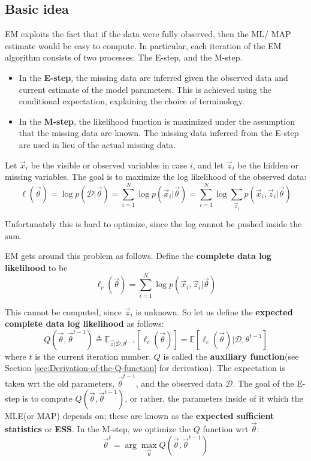 \subsection{Basic idea}
EM exploits the fact that if the data were fully observed, then the ML/ MAP estimate would be easy to compute. In particular, each iteration of the EM algorithm consists of two processes: The E-step, and the M-step. 
\begin{itemize}
\item{In the \textbf{E-step}, the missing data are inferred given the observed data and current estimate of the model parameters. This is achieved using the conditional expectation, explaining the choice of terminology.}
\item{In the \textbf{M-step}, the likelihood function is maximized under the assumption that the missing data are known. The missing data inferred from the E-step are used in lieu of the actual missing data.}
\end{itemize}

Let $\vec{x}_i$ be the visible or observed variables in case $i$, and let $\vec{z}_i$ be the hidden or missing variables. The goal is to maximize the log likelihood of the observed data:
\begin{equation}
\ell(\vec{\theta})=\log p(\mathcal{D}|\vec{\theta})=\sum\limits_{i=1}^N \log p(\vec{x}_i|\vec{\theta})=\sum\limits_{i=1}^N \log{\sum\limits_{\vec{z}_i} p(\vec{x}_i,\vec{z}_i|\vec{\theta})}
\end{equation}

Unfortunately this is hard to optimize, since the log cannot be pushed inside the sum.

EM gets around this problem as follows. Define the \textbf{complete data log likelihood} to be
\begin{equation}
\ell_c(\vec{\theta})=\sum\limits_{i=1}^N \log p(\vec{x}_i,\vec{z}_i|\vec{\theta})
\end{equation}

This cannot be computed, since $\vec{z}_i$ is unknown. So let us define the \textbf{expected complete data log likelihood} as follows:
\begin{equation}\label{eqn:auxiliary-function}
Q(\vec{\theta},\vec{\theta}^{t-1}) \triangleq \mathbb{E}_{\vec{z}|\mathcal{D},\theta^{t-1}}\left[\ell_c(\vec{\theta})\right]=\mathbb{E}\left[\ell_c(\vec{\theta})| \mathcal{D},\theta^{t-1}\right]
\end{equation}
where $t$ is the current iteration number. $Q$ is called the \textbf{auxiliary function}(see Section \ref{sec:Derivation-of-the-Q-function} for derivation). The expectation is taken wrt the old parameters, $\vec{\theta}^{t-1}$, and the observed data $\mathcal{D}$. The goal of the E-step is to compute $Q(\vec{\theta},\vec{\theta}^{t-1})$, or rather, the parameters inside of it which the MLE(or MAP) depends on; these are known as the \textbf{expected sufficient statistics} or \textbf{ESS}. In the M-step, we optimize the $Q$ function wrt $\vec{\theta}$:
\begin{equation}
\vec{\theta}^t=\arg\max_{\vec{\theta}} Q(\vec{\theta},\vec{\theta}^{t-1})
\end{equation}

